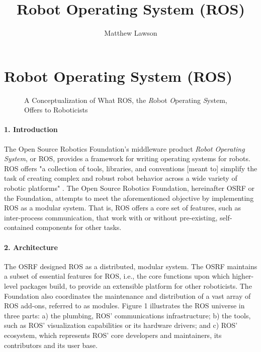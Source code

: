 \documentclass[9pt,twocolumn,twoside]{../../styles/osajnl}
\title{Robot Operating System (ROS)}
\author[1]{Matthew Lawson}
\affil[1]{School of Informatics and Computing, Bloomington, IN 47408, U.S.A.}
\affil[*]{Corresponding authors: laszewski@gmail.com}
\begin{document}
\maketitle

\section{Robot Operating System (ROS)}

\begin{figure}[htbp]
\centering
{}
\caption{A Conceptualization of What ROS, the \textit{R}obot \textit{O}perating \textit{S}ystem, Offers to Roboticists \cite{www-ros-ros-is}}
\label{fig:rosOverview}
\end{figure}

\paragraph{1. Introduction}

The Open Source Robotics Foundation's middleware product \textit{Robot Operating System}, or ROS, provides a framework for writing operating systems for robots.  ROS offers "a collection of tools, libraries, and conventions [meant to] simplify the task of creating complex and robust robot behavior across a wide variety of robotic platforms" \cite{www-ros-about}. The Open Source Robotics Foundation, hereinafter OSRF or the Foundation, attempts to meet the aforementioned objective by implementing ROS as a modular system.  That is, ROS offers a core set of features, such as inter-process communication, that work with or without pre-existing, self-contained components for other tasks.

\paragraph{2. Architecture} 

The OSRF designed ROS as a distributed, modular system.  The OSRF maintains a subset of essential features for ROS, i.e., the core functions upon which higher-level packages build, to provide an extensible platform for other roboticists.  The Foundation also coordinates the maintenance and distribution of a vast array of ROS add-ons, referred to as modules.  Figure 1 illustrates the ROS universe in three parts: a) the plumbing, ROS' communications infrastructure; b) the tools, such as ROS' visualization capabilities or its hardware drivers; and c) ROS' ecosystem, which represents ROS' core developers and maintainers, its contributors and its user base.
\end{document}
